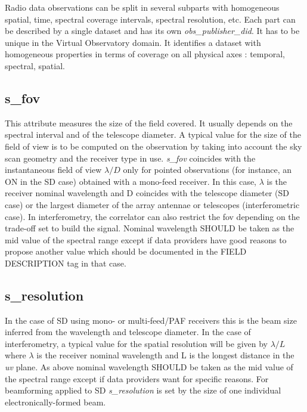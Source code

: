 \documentclass[11pt,a4paper]{ivoa}
\begin{document}
Radio data observations can be split in several subparts with homogeneous spatial,
time, spectral coverage intervals, spectral resolution, etc. Each part can be described by
a single dataset and has its own \emph{obs\_publisher\_did}. It has to be unique in the
Virtual Observatory domain.
It identifies a dataset with homogeneous properties in terms of coverage on all physical axes : temporal, spectral, spatial.

\subsection{s\_fov}
\label{sec:fov}
This attribute measures the size of the field covered. 
It usually depends on the spectral interval and of the telescope diameter.
A typical value for  the size of the field of view is to be computed on the observation by taking into account the sky scan geometry and the receiver type in use.
\emph{s\_fov } coincides with the instantaneous field of view $\lambda / D$ only for pointed observations (for instance, an ON in the SD case) obtained with a mono-feed receiver. In this case, $\lambda$ is the
receiver nominal wavelength and D coincides with the telescope diameter (SD case) or the largest diameter of the array antennae or telescopes (interferometric case).
In interferometry, the correlator can also restrict the fov depending on the trade-off set to build the signal. 
Nominal wavelength SHOULD be taken as the mid value of the spectral range except if data providers have good reasons to propose another value which should be documented in the FIELD DESCRIPTION tag in that case. 
\subsection{s\_resolution}
\label{sec:res}
In the case of SD using mono- or multi-feed/PAF receivers this is the beam size inferred from the wavelength and telescope diameter.
In the case of interferometry, a typical value for the spatial resolution will be given by $\lambda / L$ where $\lambda$
is the %
receiver nominal wavelength and L is the longest distance in the \emph{uv} plane.
As above nominal wavelength SHOULD be taken as the mid value of the spectral range except if data providers want  
for specific reasons. 
For beamforming applied to SD \emph{s\_resolution} is set by the size of one individual electronically-formed beam.
 
\end{document}
